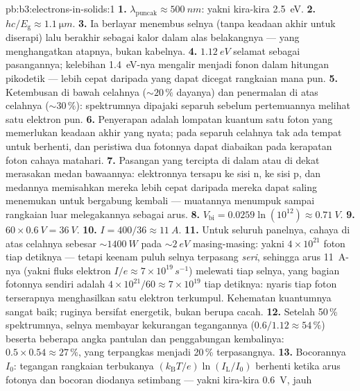 \begin{solution}{pb:b3:electrons-in-solids:1}
\textbf{1.} $\lambda_{\text{puncak}} \approx \qty{500}{nm}$:
yakni kira-kira \qty{2.5}{eV}.
\textbf{2.} $hc/E_{\text{g}} \approx \qty{1.1}{\micro m}$.
\textbf{3.} Ia berlayar menembus selnya (tanpa keadaan akhir untuk
diserapi) lalu berakhir sebagai kalor dalam alas belakangnya --- yang
menghangatkan atapnya, bukan kabelnya.
\textbf{4.} $\qty{1.12}{eV}$ selamat sebagai pasangannya; kelebihan
\qty{1.4}{eV}-nya mengalir menjadi fonon dalam hitungan pikodetik --- lebih cepat
daripada yang dapat dicegat rangkaian mana pun.
\textbf{5.} Ketembusan di bawah celahnya ($\sim20\,\%$ dayanya) dan
penermalan di atas celahnya ($\sim30\,\%$): spektrumnya dipajaki
separuh sebelum pertemuannya melihat satu elektron pun.
\textbf{6.} Penyerapan adalah lompatan kuantum satu foton yang memerlukan
keadaan akhir yang nyata; pada separuh celahnya tak ada tempat untuk berhenti, dan
peristiwa dua fotonnya dapat diabaikan pada kerapatan foton cahaya matahari.
\textbf{7.} Pasangan yang tercipta di dalam atau di dekat  merasakan
medan bawaannya: elektronnya tersapu ke sisi n,  ke sisi
p, dan medannya memisahkan mereka lebih cepat daripada mereka dapat saling
menemukan untuk bergabung kembali --- muatannya menumpuk sampai rangkaian
luar melegakannya sebagai arus.
\textbf{8.} $V_{\text{bi}} = 0.0259\ln(10^{12}) \approx
\qty{0.71}{V}$.
\textbf{9.} $60\times\qty{0.6}{V} = \qty{36}{V}$.
\textbf{10.} $I = 400/36 \approx \qty{11}{A}$.
\textbf{11.} Untuk seluruh panelnya, cahaya di atas celahnya sebesar
$\sim\qty{1400}{W}$ pada $\sim\qty{2}{eV}$ masing-masing: yakni $4\times10^{21}$
foton tiap detiknya --- tetapi keenam puluh selnya terpasang \emph{seri},
sehingga arus \qty{11}{A}-nya (yakni fluks elektron $I/e \approx
7\times10^{19}\,\unit{s^{-1}}$) melewati tiap selnya, yang
bagian fotonnya sendiri adalah $4\times10^{21}/60 \approx
7\times10^{19}$ tiap detiknya: nyaris tiap foton terserapnya menghasilkan
satu elektron terkumpul. Kehematan kuantumnya sangat baik;
ruginya bersifat energetik, bukan berupa cacah.
\textbf{12.} Setelah 50\,\% spektrumnya, selnya membayar
kekurangan tegangannya ($0.6/1.12 \approx 54\,\%$) beserta beberapa angka
pantulan dan penggabungan kembalinya: $0.5\times0.54 \approx 27\,\%$,
yang terpangkas menjadi 20\,\% terpasangnya.
\textbf{13.} Bocorannya $I_0$: tegangan rangkaian terbukanya
$(k_{\text{B}}T/e)\ln(I_{\text{L}}/I_0)$ berhenti ketika
arus fotonya dan bocoran diodanya setimbang --- yakni kira-kira \qty{0.6}{V}, jauh

\end{solution}
